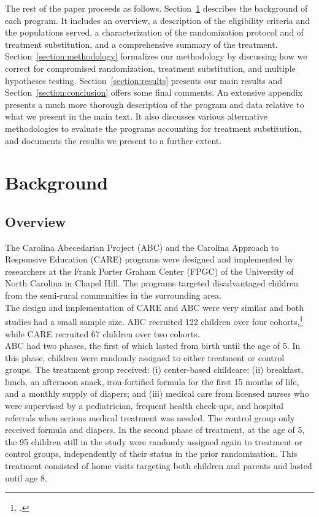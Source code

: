 \noindent The rest of the paper proceeds as follows. Section~\ref{section:background} describes the background of each program. It includes an overview, a description of the eligibility criteria and the populations served, a characterization of the randomization protocol and of treatment substitution, and a comprehensive summary of the treatment.  Section~\ref{section:methodology} formalizes our methodology by discussing how we correct for compromised randomization, treatment substitution, and multiple hypotheses testing. Section~\ref{section:results} presents our main results and Section~\ref{section:conclusion} offers some final comments. An extensive appendix presents a much more thorough description of the program and data relative to what we present in the main text. It also discusses various alternative methodologies to evaluate the programs accounting for treatment substitution, and documents the results we present to a further extent.

\section{Background} \label{section:background}
\subsection{Overview}

\noindent The Carolina Abecedarian Project (ABC) and the Carolina Approach to Responsive Education (CARE) programs were designed and implemented by researchers at the Frank Porter Graham Center (FPGC) of the University of North Carolina in Chapel Hill. The programs targeted disadvantaged children from the semi-rural communities in the surrounding area.\\

\noindent The design and implementation of CARE and ABC were very similar and both studies had a small sample size. ABC recruited 122 children over four cohorts,\footnote{\citet{Ramey_Collier_etal_1976_CarolinaAbecedarianProject}.} while CARE recruited 67 children over two cohorts.\\  

\noindent ABC had two phases, the first of which lasted from birth until the age of 5. In this phase, children were randomly assigned to either treatment or control groups. The treatment group received: (i) center-based childcare; (ii) breakfast, lunch, an afternoon snack, iron-fortified formula for the first 15 months of life, and a monthly supply of diapers; and (iii) medical care from licensed nurses who were supervised by a pediatrician, frequent health check-ups, and hospital referrals when serious medical treatment was needed. The control group only received formula and diapers. In the second phase of treatment, at the age of 5, the 95 children still in the study were randomly assigned again to treatment or control groups, independently of their status in the prior randomization. This treatment consisted of home visits targeting both children and parents and lasted until age 8.\\ 

